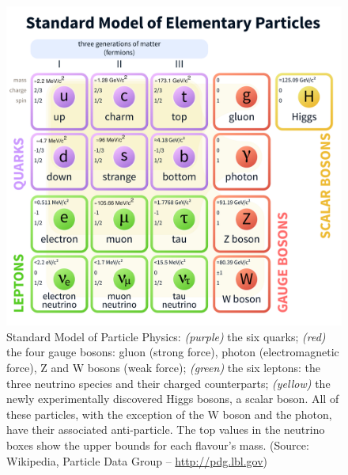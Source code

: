 \begin{figure}
\begin{center}
\includegraphics[scale=0.30]{Intro-FIGS/standard_model}
\caption[Standard Model of Particle Physics. (Source: Particle Data Group -- \url{http://pdg.lbl.gov})]{Standard Model of Particle Physics: \textit{(purple)} the six quarks; \textit{(red)} the four gauge bosons: gluon (strong force), photon (electromagnetic force), Z and W bosons (weak force); \textit{(green)} the six leptons: the three neutrino species and their charged counterparts; \textit{(yellow)} the newly experimentally discovered Higgs bosons, a scalar boson. All of these particles, with the exception of the W boson and the photon, have their associated anti-particle. The top values in the neutrino boxes show the upper bounds for each flavour's mass. (Source: Wikipedia, Particle Data Group -- \url{http://pdg.lbl.gov})}
\label{fig:Intro:StandardModel}
\end{center}
\end{figure}


